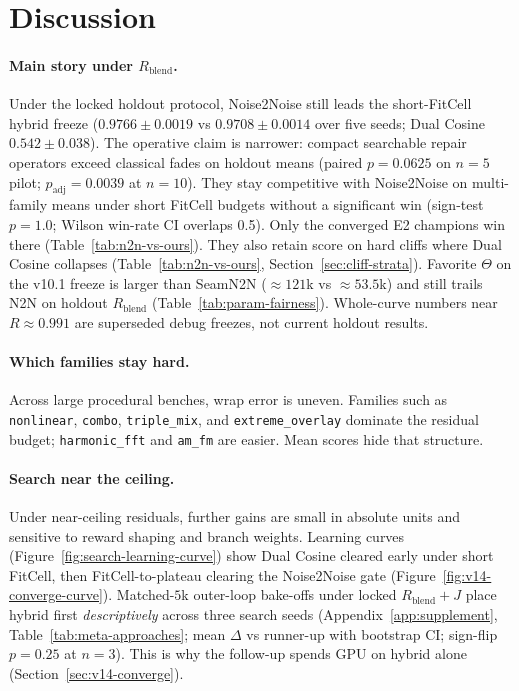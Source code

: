 \section{Discussion}
\label{sec:discussion}

\paragraph{Main story under $R_{\mathrm{blend}}$.}
Under the locked holdout protocol, Noise2Noise still leads the short-FitCell hybrid freeze
($0.9766{\pm}0.0019$ vs $0.9708{\pm}0.0014$ over five seeds; Dual Cosine $0.542{\pm}0.038$).
The operative claim is narrower: compact searchable repair operators exceed classical fades on holdout means (paired $p{=}0.0625$ on $n{=}5$ pilot; $p_{\mathrm{adj}}{=}0.0039$ at $n{=}10$). They stay competitive with Noise2Noise on multi-family means under short FitCell budgets without a significant win (sign-test $p{=}1.0$; Wilson win-rate CI overlaps 0.5). Only the converged E2 champions win there (Table~\ref{tab:n2n-vs-ours}). They also retain score on hard cliffs where Dual Cosine collapses
(Table~\ref{tab:n2n-vs-ours}, Section~\ref{sec:cliff-strata}).
Favorite $\Theta$ on the v10.1 freeze is larger than SeamN2N (${\approx}121$k vs ${\approx}53.5$k) and still trails N2N on holdout $R_{\mathrm{blend}}$
(Table~\ref{tab:param-fairness}).
Whole-curve numbers near $R{\approx}0.991$ are superseded debug freezes, not current holdout results.

\paragraph{Which families stay hard.}
Across large procedural benches, wrap error is uneven.
Families such as \texttt{nonlinear}, \texttt{combo}, \texttt{triple\_mix}, and \texttt{extreme\_overlay} dominate the residual budget;
\texttt{harmonic\_fft} and \texttt{am\_fm} are easier.
Mean scores hide that structure.

\paragraph{Search near the ceiling.}
Under near-ceiling residuals, further gains are small in absolute units and sensitive to reward shaping and branch weights.
Learning curves (Figure~\ref{fig:search-learning-curve}) show Dual Cosine cleared early under short FitCell,
then FitCell-to-plateau clearing the Noise2Noise gate (Figure~\ref{fig:v14-converge-curve}).
Matched-$5$k outer-loop bake-offs under locked $R_{\mathrm{blend}}{+}J$ place hybrid first \emph{descriptively} across three search seeds
(Appendix~\ref{app:supplement}, Table~\ref{tab:meta-approaches}; mean $\Delta$ vs runner-up with bootstrap CI; sign-flip $p{=}0.25$ at $n{=}3$). This is why the follow-up spends GPU on hybrid alone
(Section~\ref{sec:v14-converge}).

